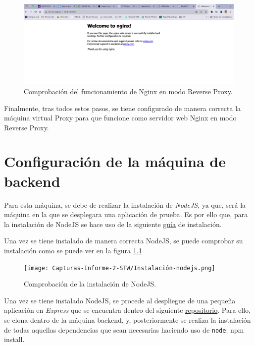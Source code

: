 \documentclass{report}
\begin{document}
  \begin{figure}[H]
    \centering
    \includegraphics[scale=0.6]{Capturas-Informe-2-STW/Funcionamiento-de-ngingx.png}
    \caption{Comprobación del funcionamiento de Nginx en modo Reverse Proxy.}
    \label{fig:Comprobación-Reverse-Proxy}
  \end{figure}

  Finalmente, tras todos estos pasos, se tiene configurado de manera correcta la máquina virtual Proxy para que funcione como servidor web Nginx en modo Reverse Proxy.

  \chapter{Configuración de la máquina de backend}
  Para esta máquina, se debe de realizar la instalación de \emph{NodeJS}, ya que, será la máquina en la que se desplegara una aplicación de prueba. Es por ello que, para la instalación de NodeJS se hace uso de la siguiente \href{https://linuxconfig.org/how-to-install-nodejs-on-debian-9-stretch-linux}{guía} de instalación.

  Una vez se tiene instalado de manera correcta NodeJS, se puede comprobar su instalación como se puede ver en la figura \ref{fig:Comprobación-NodeJS}

  \begin{figure}[H]
    \centering
    \texttt{[image: Capturas-Informe-2-STW/Instalación-nodejs.png]}
    \caption{Comprobación de la instalación de NodeJS.}
    \label{fig:Comprobación-NodeJS}
  \end{figure}

  Una vez se tiene instalado NodeJS, se procede al despliegue de una pequeña aplicación en \emph{Express} que se encuentra dentro del siguiente \href{https://github.com/crguezl/express-start}{repositorio}. Para ello, se clona dentro de la máquina backend, y, posteriormente se realiza la instalación de todas aquellas dependencias que sean necesarias haciendo uso de \verb|node|: npm install.
\end{document}
